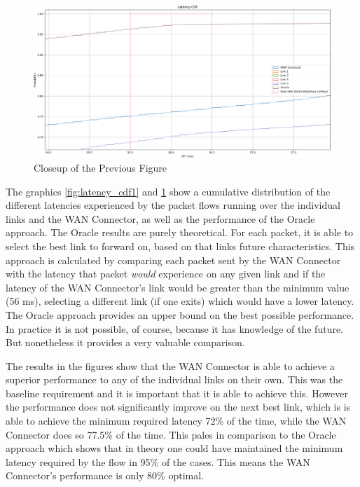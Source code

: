 \begin{figure}[h]
    \centering
        \includegraphics[height=0.66\textwidth,width=\textwidth]{fig/latency_cdf1_super_zoomed_in.png}
        \caption{Closeup of the Previous Figure}
        \label{fig:latency_cdf1_super_zoomed_in}
\end{figure}

The graphics \ref{fig:latency_cdf1} and \ref{fig:latency_cdf1_super_zoomed_in} show a cumulative distribution of the different latencies experienced by the packet flows running over the individual links and the WAN Connector, as well as the performance of the Oracle approach. The Oracle results are purely theoretical. For each packet, it is able to select the best link to forward on, based on that links future characteristics. This approach is calculated by comparing each packet sent by the WAN Connector with the latency that packet \textit{would} experience on any given link and if the latency of the WAN Connector's link would be greater than the minimum value (56 ms), selecting a different link (if one exits) which would have a lower latency. The Oracle approach provides an upper bound on the best possible performance. In practice it is not possible, of course, because it has knowledge of the future. But nonetheless it provides a very valuable comparison.

The results in the figures show that the WAN Connector is able to achieve a superior performance to any of the individual links on their own. This was the baseline requirement and it is important that it is able to achieve this. However the performance does not significantly improve on the next best link, which is is able to achieve the minimum required latency 72\% of the time, while the WAN Connector does so 77.5\% of the time. This pales in comparison to the Oracle approach which shows that in theory one could have maintained the minimum latency required by the flow in 95\% of the cases. This means the WAN Connector's performance is only 80\% optimal.

